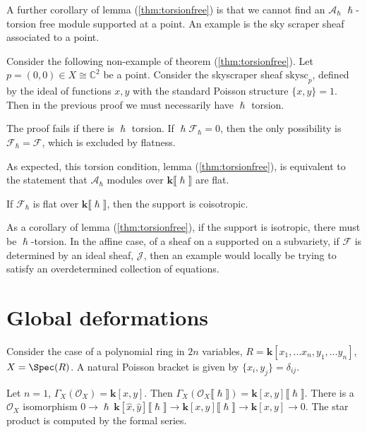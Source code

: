     A further corollary of lemma (\ref{thm:torsionfree}) is that we cannot find an \( \mathcal{A}_\hslash \) \(\hslash \)-torsion free module supported at a point. An example is the sky scraper sheaf associated to a point.

    \begin{ex}Consider the following non-example of theorem (\ref{thm:torsionfree}). Let \( p = (0,0) \in X \cong \mathbb{C}^2 \) be a point. Consider the skyscraper sheaf \( \mathrm{skysc}_p \), defined by  the ideal of functions \( x,y\) with the standard Poisson structure \( \{ x,y \} = 1\). Then in the previous proof we must necessarily have \( \hslash \) torsion.
    \end{ex}

    
    The proof fails if there is \( \hslash\) torsion. If \( \hslash \mathcal{F}_{\hslash} = 0\), then the only possibility is \( \mathcal{F}_{\hslash} = \mathcal{F}\), which is excluded by flatness.
    
    As expected, this torsion condition, lemma (\ref{thm:torsionfree}), is equivalent to the statement that \( \mathcal{A}_{\hslash}\) modules over \( \mathbf{k}\lBrack \hslash \rBrack \) are flat.
    
    \begin{lem} If \( \mathcal{F}_\hslash\) is flat over \( \mathbf{k}\lBrack \hslash \rBrack \), then the support is coisotropic.
    \end{lem}
    
    As a corollary of lemma (\ref{thm:torsionfree}), if the support is isotropic, there must be \(\hslash\)-torsion. In the  affine case, of a sheaf on a supported on a subvariety, if \(\mathcal{F}\) is determined by an ideal sheaf, \(\mathcal{J}\), then an example would locally be trying to satisfy an overdetermined collection of equations. 
    
    \section{Global deformations}
    
    Consider the case of a polynomial ring in \(2n\) variables, \(R = \mathbf{k}[x_1, \dots x_n, y_1, \dots y_n]\), \(X= \Spec(R)\). A natural Poisson bracket is given by \( \{x_i,y_j\} = \delta_{ij}\).
    \begin{ex}
    Let \(n=1\), \( \Gamma_X( \mathcal{O}_X) = \mathbf{k}[x,y]\). Then  \(\Gamma_X (\mathcal{O}_X \lBrack \hslash \rBrack) = \mathbf{k}[x,y]\lBrack \hslash \rBrack \). There is a \(\mathcal{O}_X\) isomorphism  \(0 \rightarrow \hslash\, \mathbf{k}[\hat{x},\hat{y}]\lBrack \hslash \rBrack \rightarrow \mathbf{k}[x,y]\lBrack \hslash \rBrack  \rightarrow \mathbf{k}[x,y] \rightarrow 0\). The star product is computed by the formal series.
    \end{ex}
    

